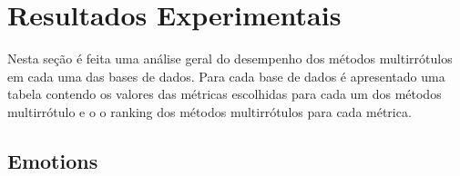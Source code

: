 % 


\section{Resultados Experimentais}
Nesta seção é feita uma análise geral do desempenho dos métodos multirrótulos em cada uma das bases de dados.
Para cada base de dados é apresentado uma tabela
contendo os valores das métricas escolhidas para cada um dos métodos multirrótulo e o
o ranking dos métodos multirrótulos para cada métrica.

\subsection{Emotions}

